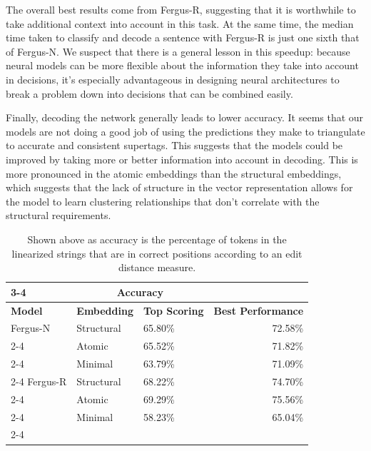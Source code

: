 \documentclass[11pt]{article}
\begin{document}
The overall best results come from Fergus-R, suggesting that it is
worthwhile to take additional context into account in this task.
%
At the same time, the median time taken to classify and decode a
sentence with Fergus-R is just one sixth that of Fergus-N.
%
We suspect that there is a general lesson in this speedup: because
neural models can be more flexible about the information they take
into account in decisions, it's especially advantageous in designing
neural architectures to break a problem down into decisions that can
be combined easily.


Finally, decoding the network generally leads to lower accuracy.
%
It seems that our models are not doing a good job of using the
predictions they make to triangulate to accurate and consistent
supertags. 
%
This suggests that the models could be improved by taking more or
better information into account in decoding.
%
This is more pronounced in the atomic embeddings than the structural embeddings, which suggests that the lack of structure in the vector representation allows for the model to learn clustering relationships that don't correlate with the structural requirements. 


\begin{table}
\centering
\begin{tabular}{|l|p{3cm}|p{2.5cm}|r|}
\cline{3-4}
\multicolumn{2}{}{} & \multicolumn{2}{|c|}{Accuracy}   \\ \hline
\textbf{Model} & \textbf{Embedding}  & \textbf{Top Scoring} & \textbf{Best Performance} \\ \hline
Fergus-N & Structural & 65.80\% & 72.58\% \\ \cline{2-4}
         & Atomic       & 65.52\%  & 71.82\% \\ \cline{2-4}
         & Minimal & 63.79\% & 71.09\% \\ \cline{2-4}
\hline
Fergus-R & Structural & 68.22\% & 74.70\% \\ \cline{2-4}
         & Atomic       &  69.29\% & 75.56\% \\ \cline{2-4}
         & Minimal &  58.23\% & 65.04\% \\ \cline{2-4}
\hline
\end{tabular}
\caption{Shown above as accuracy is the percentage of tokens in the linearized strings that are in correct positions according to an edit distance measure.}
\label{table:linresults}
\end{table}
\end{document}
